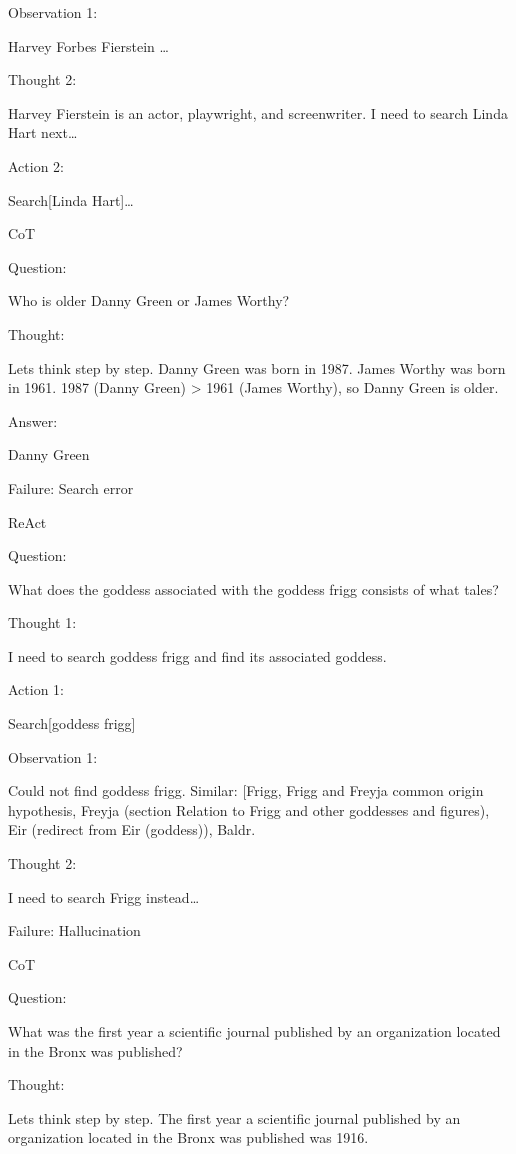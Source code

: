 \documentclass[
]{article}
\begin{document}
Observation 1:

Harvey Forbes Fierstein \ldots{}

Thought 2:

Harvey Fierstein is an actor, playwright, and screenwriter. I need to
search Linda Hart next\ldots{}

Action 2:

Search{[}Linda Hart{]}\ldots{}

CoT

Question:

Who is older Danny Green or James Worthy?

Thought:

Let\textquotesingle s think step by step. Danny Green was born in 1987.
James Worthy was born in 1961. 1987 (Danny Green) \textgreater{} 1961
(James Worthy), so Danny Green is older.

Answer:

Danny Green

Failure: Search error

ReAct

Question:

What does the goddess associated with the goddess frigg consists of what
tales?

Thought 1:

I need to search goddess frigg and find its associated goddess.

Action 1:

Search{[}goddess frigg{]}

Observation 1:

Could not find goddess frigg. Similar:
{[}\textquotesingle Frigg\textquotesingle, \textquotesingle Frigg and
Freyja common origin hypothesis\textquotesingle, \textquotesingle Freyja
(section Relation to Frigg and other goddesses and
figures)\textquotesingle, \textquotesingle Eir (redirect from Eir
(goddess))\textquotesingle, \textquotesingle Baldr\textquotesingle{]}.

Thought 2:

I need to search Frigg instead\ldots{}

Failure: Hallucination

CoT

Question:

What was the first year a scientific journal published by an
organization located in the Bronx was published?

Thought:

Let\textquotesingle s think step by step. The first year a scientific
journal published by an organization located in the Bronx was published
was 1916.
\end{document}
